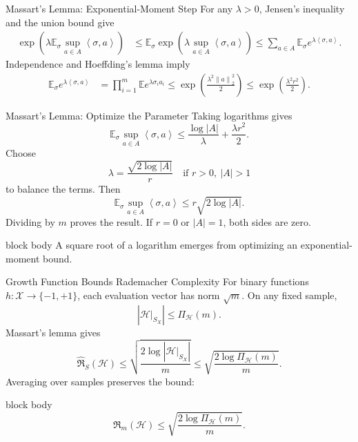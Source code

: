 \documentclass[aspectratio=169,10pt]{beamer}
\newcommand{\X}{\mathcal{X}}
\newcommand{\Hc}{\mathcal{H}}
\newcommand{\Rad}{\mathfrak{R}}
\newcommand{\RadS}{\widehat{\mathfrak{R}}_S}
\newcommand{\PiH}{\Pi_{\Hc}}
\newcommand{\pmone}{\{-1,+1\}}
\newcommand{\E}{\mathbb{E}}
\newcommand{\norm}[1]{\left\lVert #1\right\rVert}
\newcommand{\abs}[1]{\left\lvert #1\right\rvert}
\newcommand{\angles}[1]{\left\langle #1\right\rangle}
\newcommand{\KeyBox}[1]{%
  \begin{beamercolorbox}[rounded=true,sep=0.22cm,wd=\linewidth]{block body}
    #1
  \end{beamercolorbox}%
}
\begin{document}
\begin{frame}[t]{Massart's Lemma: Exponential-Moment Step}
  \vspace{0.01cm}
  {\small
  For any $\lambda>0$, Jensen's inequality and the union bound give
  \begin{align*}
    \exp\!\left(\lambda\E_\sigma\sup_{a\in A}\angles{\sigma,a}\right)
    &\le \E_\sigma\exp\!\left(\lambda\sup_{a\in A}\angles{\sigma,a}\right)\le \sum_{a\in A}\E_\sigma e^{\lambda\angles{\sigma,a}}.
  \end{align*}
  Independence and Hoeffding's lemma imply
  \begin{align*}
    \E_\sigma e^{\lambda\angles{\sigma,a}}
    &=\prod_{i=1}^m\E e^{\lambda\sigma_i a_i}
    \le \exp\!\left(\frac{\lambda^2\norm{a}_2^2}{2}\right)\le \exp\!\left(\frac{\lambda^2r^2}{2}\right).
  \end{align*}}
\end{frame}

\begin{frame}[t]{Massart's Lemma: Optimize the Parameter}
  \vspace{0.03cm}
  Taking logarithms gives
  \[
    \E_\sigma\sup_{a\in A}\angles{\sigma,a}
    \le \frac{\log\abs{A}}{\lambda}+\frac{\lambda r^2}{2}.
  \]
  Choose
  \[
    \lambda=\frac{\sqrt{2\log\abs{A}}}{r}\quad\text{if }r>0,\ \abs{A}>1
  \]
  to balance the terms. Then
  \[
    \E_\sigma\sup_{a\in A}\angles{\sigma,a}
    \le r\sqrt{2\log\abs{A}}.
  \]
  Dividing by $m$ proves the result. If $r=0$ or $\abs{A}=1$, both sides are zero.
  \vspace{0.08cm}
  \KeyBox{A square root of a logarithm emerges from optimizing an exponential-moment bound.}
\end{frame}

\begin{frame}[t]{Growth Function Bounds Rademacher Complexity}
  \vspace{0.01cm}
  For binary functions $h:\X\to\pmone$, each evaluation vector has norm $\sqrt m$. On any fixed sample,
  \[
    \abs{\Hc\vert_{S_X}}\le\PiH(m).
  \]
  Massart's lemma gives
  \[
    \RadS(\Hc)
    \le \sqrt{\frac{2\log\abs{\Hc\vert_{S_X}}}{m}}
    \le \sqrt{\frac{2\log\PiH(m)}{m}}.
  \]
  Averaging over samples preserves the bound:
  \begin{beamercolorbox}[rounded=true,sep=0.18cm,wd=\linewidth]{block body}
    \[
      \boxed{\Rad_m(\Hc)\le\sqrt{\frac{2\log\PiH(m)}{m}}.}
    \]
  \end{beamercolorbox}
\end{frame}
\end{document}
